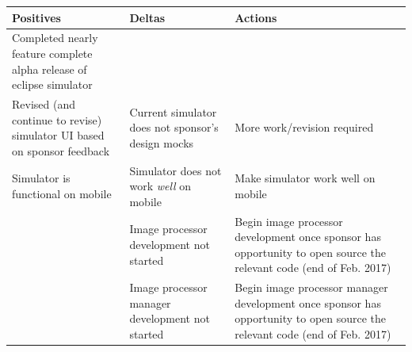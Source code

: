 \documentclass[10pt, onecolumn, draftclsnofoot, letterpaper, compsoc]{IEEEtran}
\begin{document}
\begin{table}[!h]
    \centering
    \begin{tabular}{|p{.3\linewidth}|p{.3\linewidth}|p{.3\linewidth}|}

    \cline{3-3}

    \hline \textbf{Positives} & \textbf{Deltas} & \textbf{Actions} \\ \hline

    Completed nearly feature complete alpha release of eclipse simulator &  &  \\ \hline
    Revised (and continue to revise) simulator UI based on sponsor feedback & Current simulator does not sponsor's design mocks & More work/revision required \\ \hline
	Simulator is functional on mobile & Simulator does not work \textit{well} on mobile & Make simulator work well on mobile \\ \hline
     & Image processor development not started & Begin image processor development once sponsor has opportunity to open source the relevant code (end of Feb. 2017) \\ \hline
     & Image processor manager development not started & Begin image processor manager development once sponsor has opportunity to open source the relevant code (end of Feb. 2017) \\ \hline

    \end{tabular}
\end{table}
\end{document}
